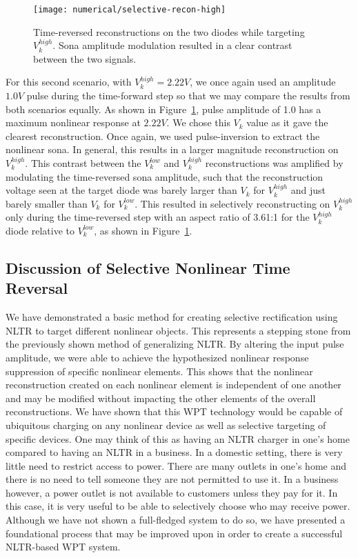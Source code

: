 \begin{figure}[t]
\centering
\texttt{[image: numerical/selective-recon-high]}
\caption[Selective reconstruction on a $V_{k}^{high}$ diode]{Time-reversed reconstructions on the two diodes while targeting $V_{k}^{high}$. Sona amplitude modulation resulted in a clear contrast between the two signals.}
\label{fig:numerical-selective-recon-high}
\end{figure}

For this second scenario, with $V_k^{high} = 2.22V$, we once again used an amplitude $1.0 V$ pulse during the time-forward step so that we may compare the results from both scenarios equally. As shown in Figure~\ref{fig:numerical-selective-recon-high}, pulse amplitude of 1.0 has a maximum nonlinear response at $2.22V$. We chose this $V_k$ value as it gave the clearest reconstruction. Once again, we used pulse-inversion to extract the nonlinear sona. In general, this results in a larger magnitude reconstruction on $V_k^{high}$. This contrast between the $V_k^{low}$ and $V_k^{high}$ reconstructions was amplified by modulating the time-reversed sona amplitude, such that the reconstruction voltage seen at the target diode was barely larger than $V_k$ for $V_k^{high}$ and just barely smaller than $V_k$ for $V_k^{low}$. This resulted in selectively reconstructing on $V_k^{high}$ only during the time-reversed step with an aspect ratio of 3.61:1 for the $V_k^{high}$  diode relative to $V_k^{low}$, as shown in Figure~\ref{fig:numerical-selective-recon-high}.

\subsection{Discussion of Selective Nonlinear Time Reversal}

We have demonstrated a basic method for creating selective rectification using NLTR to target different nonlinear objects. This represents a stepping stone from the previously shown method of generalizing NLTR. By altering the input pulse amplitude, we were able to achieve the hypothesized nonlinear response suppression of specific nonlinear elements. This shows that the nonlinear reconstruction created on each nonlinear element is independent of one another and may be modified without impacting the other elements of the overall reconstructions. We have shown that this WPT technology would be capable of ubiquitous charging on any nonlinear device as well as selective targeting of specific devices. One may think of this as having an NLTR charger in one's home compared to having an NLTR in a business. In a domestic setting, there is very little need to restrict access to power. There are many outlets in one's home and there is no need to tell someone they are not permitted to use it. In a business however, a power outlet is not available to customers unless they pay for it. In this case, it is very useful to be able to selectively choose who may receive power. Although we have not shown a full-fledged system to do so, we have presented a foundational process that may be improved upon in order to create a successful NLTR-based WPT system.

